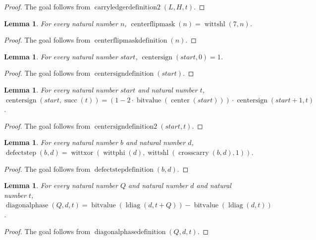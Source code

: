 \documentclass[11pt]{article}
\newtheorem{lemma}[theorem]{Lemma}
\theoremstyle{definition}
\begin{document}
\begin{proof}
The goal follows from \(\operatorname{carryledgerdefinition2}(L, H, t)\).
\end{proof}
\begin{lemma}
\label{ll:observations:center-flip-mask-definition}
For every natural number \(n\), \(\operatorname{centerflipmask}(n) = \operatorname{wittshl}(7, n)\).
\end{lemma}
\begin{proof}
The goal follows from \(\operatorname{centerflipmaskdefinition}(n)\).
\end{proof}
\begin{lemma}
\label{ll:observations:center-sign-definition}
For every natural number \(start\), \(\operatorname{centersign}(start, 0) = 1\).
\end{lemma}
\begin{proof}
The goal follows from \(\operatorname{centersigndefinition}(start)\).
\end{proof}
\begin{lemma}
\label{ll:observations:center-sign-definition-2}
For every natural number \(start\) and natural number \(t\), \(\operatorname{centersign}(start, \operatorname{succ}(t)) = (1 - 2 \cdot \operatorname{bitvalue}(\operatorname{center}(start))) \cdot \operatorname{centersign}(start + 1, t)\).
\end{lemma}
\begin{proof}
The goal follows from \(\operatorname{centersigndefinition2}(start, t)\).
\end{proof}
\begin{lemma}
\label{ll:observations:defect-step-definition}
For every natural number \(b\) and natural number \(d\), \(\operatorname{defectstep}(b, d) = \operatorname{wittxor}(\operatorname{wittphi}(d), \operatorname{wittshl}(\operatorname{crosscarry}(b, d), 1))\).
\end{lemma}
\begin{proof}
The goal follows from \(\operatorname{defectstepdefinition}(b, d)\).
\end{proof}
\begin{lemma}
\label{ll:observations:diagonal-phase-definition}
For every natural number \(Q\) and natural number \(d\) and natural number \(t\), \(\operatorname{diagonalphase}(Q, d, t) = \operatorname{bitvalue}(\operatorname{ldiag}(d, t + Q)) - \operatorname{bitvalue}(\operatorname{ldiag}(d, t))\).
\end{lemma}
\begin{proof}
The goal follows from \(\operatorname{diagonalphasedefinition}(Q, d, t)\).
\end{proof}
\end{document}
